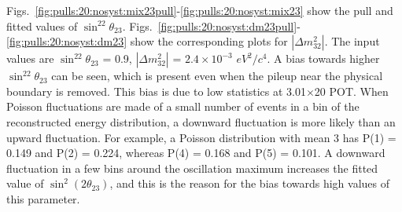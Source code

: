 Figs.\ \ref{fig:pulls:20:nosyst:mix23pull}-\ref{fig:pulls:20:nosyst:mix23} show the pull and fitted values of
$\sin^22\theta_{23}$.
Figs.\ \ref{fig:pulls:20:nosyst:dm23pull}-\ref{fig:pulls:20:nosyst:dm23} show the corresponding plots for 
$|\Delta m^2_{32}|$.
The input values are $\sin^22\theta_{23}$ = 0.9, $|\Delta m^2_{32}|$ = $2.4 \times 10^{-3}$ $eV^2/c^4$.
A bias towards higher $\sin^22\theta_{23}$ can be seen, which is present even when the pileup near the physical boundary is removed.
This bias is due to low statistics at 3.01$\times$20 POT. When Poisson fluctuations are made of a small number of events in a bin of 
the reconstructed energy distribution, a downward fluctuation is more likely than an upward fluctuation. For example, a Poisson 
distribution with mean 3 has P(1) = 0.149 and P(2) = 0.224, whereas P(4) = 0.168 and P(5) = 0.101. A downward fluctuation in a few 
bins around the oscillation maximum increases the fitted value of $\sin^{2}(2\theta_{23})$, and this is the reason for the bias 
towards high values of this parameter.

